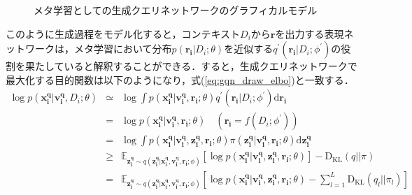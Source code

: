 \begin{figure}[tbp]
\begin{center}
\caption{メタ学習としての生成クエリネットワークのグラフィカルモデル}
\label{fig:gm_meta_gqn}
\end{center}
\end{figure}

このように生成過程をモデル化すると，コンテキスト$D_i$から$\bm{r}$を出力する表現ネットワークは，メタ学習において分布$p( \bm{r_i} | D_i ; \theta )$を近似する$q^\prime ( \bm{r_i} | D_i ; {\phi}^\prime )$の役割を果たしていると解釈することができる．すると，生成クエリネットワークで最大化する目的関数は以下のようになり，式(\ref{eq:gqn_draw_elbo})と一致する．
\begin{eqnarray}
\log p ( \bm{x _ i  ^ q} | \bm{v _i ^ q} , D_i ; \theta ) 
&\simeq& \log \int p ( \bm{x _i ^ q} | \bm{v _i ^ q} , \bm{r _ i} ; \theta ) q^\prime ( \bm{r_i} | D_i ; {\phi}^\prime ) \mathrm { d } \bm{r_i} \label{eq:approximation_r} \\
&=& \log p ( \bm{x_i^q} | \bm{v_i^q}, \bm{r_i}; \theta)  \quad (\bm{r_i} = f(D_i; {\phi}^\prime)) \\
&=& \log \int p ( \bm{x _i^ q} | \bm{v_i ^ q} , \bm{z _i^ q} , \bm{r _i} ; \theta ) \pi (\bm{z_i^q} | \bm{v_i^q}, \bm{r_i}; \theta) \mathrm { d } \bm{z_i^q} \\
&\geq& 
\mathbb{E} _ {\bm{z_i^q} \sim q(\bm{z_i^q}|\bm{x_i^q}, \bm{v_i^q}, \bm{r_i}; \phi)} [\log p ( \bm{x_i ^ q} | \bm{v_i ^ q} , \bm{z _i^ q} , \bm{r_i} ; \theta )]
- \mathrm{D_{KL}} (q||\pi) \\
&=& 
\mathbb{E} _ {\bm{z_i^q} \sim q(\bm{z_i^q}|\bm{x_i^q}, \bm{v_i^q}, \bm{r_i}; \phi)} [\log p ( \bm{x_i ^ q} | \bm{v_i ^ q} , \bm{z _i^ q} , \bm{r_i} ; \theta )
-  \sum _ { l = 1 } ^ { L } {\mathrm { D } _ { \mathrm { KL } }}
	(q_l || \pi_l) ] \label{eq:meta_gqn_elbo}
\end{eqnarray}

